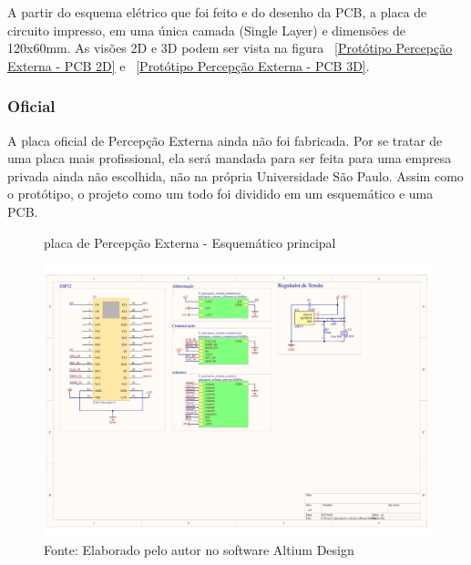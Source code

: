 \documentclass[../delivery_hospital_report.tex]{subfiles}
\begin{document}
  A partir do esquema elétrico que foi feito e do desenho da PCB, a placa de circuito impresso, em uma única camada (Single Layer) e dimensões de 120x60mm. As visões 2D e 3D podem ser vista na figura   ~\ref{Protótipo Percepção Externa - PCB 2D} e ~\ref{Protótipo Percepção Externa - PCB 3D}.
  

\clearpage
\subsubsection{Oficial}

A placa oficial de Percepção Externa ainda não foi fabricada. Por se tratar de uma placa mais profissional, ela será mandada para ser feita para uma empresa privada ainda não escolhida, não na própria Universidade São Paulo. Assim como o protótipo, o projeto como um todo foi dividido em um esquemático e uma PCB.

\begin{figure}[!ht]
\centering
    \caption{placa de Percepção Externa - Esquemático principal }
    \centering %
    \includegraphics[width=17cm]{modulos/percepcao_externa_official-1.png}
    \caption*{Fonte: Elaborado pelo autor no software Altium Design\cite{altium21} }
    \label{Protótipo placa de ## - Esquemático principal}
\end{figure}
\end{document}
